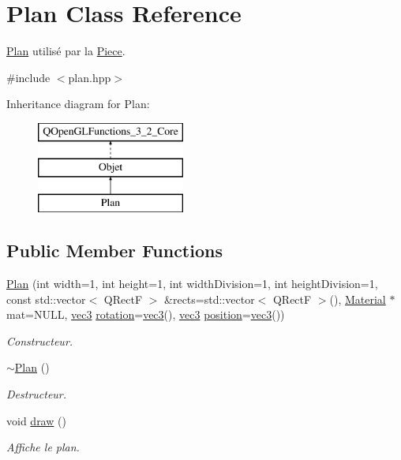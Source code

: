 \hypertarget{class_plan}{\section{Plan Class Reference}
\label{class_plan}
}


\hyperlink{class_plan}{Plan} utilisé par la \hyperlink{class_piece}{Piece}.  




{\ttfamily \#include $<$plan.\+hpp$>$}

Inheritance diagram for Plan\+:\begin{figure}[H]
\begin{center}
\leavevmode
\includegraphics[height=3.000000cm]{class_plan}
\end{center}
\end{figure}
\subsection*{Public Member Functions}
\begin{DoxyCompactItemize}
\item 
\hyperlink{class_plan_a1cdbbb75d0a7a9aeaeb9d72abdf9ccf6}{Plan} (int width=1, int height=1, int width\+Division=1, int height\+Division=1, const std\+::vector$<$ Q\+Rect\+F $>$ \&rects=std\+::vector$<$ Q\+Rect\+F $>$(), \hyperlink{class_material}{Material} $\ast$mat=N\+U\+L\+L, \hyperlink{structvec3}{vec3} \hyperlink{class_objet_ac69a1b459bcb4433099c8cfbff06b209}{rotation}=\hyperlink{structvec3}{vec3}(), \hyperlink{structvec3}{vec3} \hyperlink{class_objet_a0e109bc790b14328202dd2546b04e2fd}{position}=\hyperlink{structvec3}{vec3}())
\begin{DoxyCompactList}\small\item\em Constructeur. \end{DoxyCompactList}\item 
\hyperlink{class_plan_a4df05d0211ed4572125f79cbfaafa626}{$\sim$\+Plan} ()
\begin{DoxyCompactList}\small\item\em Destructeur. \end{DoxyCompactList}\item 
void \hyperlink{class_plan_a513c3dec0ce9043a9e1d3b5b18a6d698}{draw} ()
\begin{DoxyCompactList}\small\item\em Affiche le plan. \end{DoxyCompactList}\end{DoxyCompactItemize}
